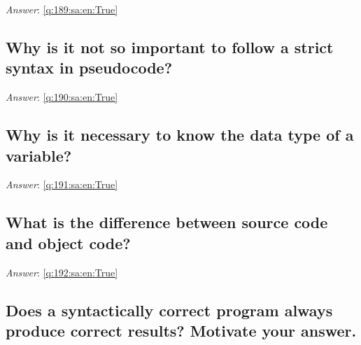 \documentclass[a4paper,11pt,oneside]{article}
\begin{document}
\begin{sloppypar}
\noindent\makebox[\textwidth]{\hrulefill}

\vspace{1cm}

\textit{Answer}: \autoref{q:189:sa:en:True}



\subsection{Why is it not so important to follow a strict syntax in pseudocode?}

\label{q:190:sa:en:False}

\vspace{2cm}

\noindent\makebox[\textwidth]{\hrulefill}

\vspace{1cm}

\textit{Answer}: \autoref{q:190:sa:en:True}



\subsection{Why is it necessary to know the data type of a variable?}

\label{q:191:sa:en:False}

\vspace{2cm}

\noindent\makebox[\textwidth]{\hrulefill}

\vspace{1cm}

\textit{Answer}: \autoref{q:191:sa:en:True}



\subsection{What is the difference between source code and object code?}

\label{q:192:sa:en:False}

\vspace{2cm}

\noindent\makebox[\textwidth]{\hrulefill}

\vspace{1cm}

\textit{Answer}: \autoref{q:192:sa:en:True}



\subsection{Does a syntactically correct program always produce correct results? Motivate your answer.}


\end{sloppypar}
\end{document}
